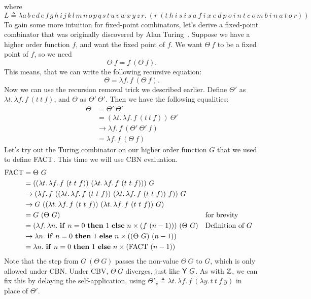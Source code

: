 where
\[
  L\triangleq\lambda a\,b\,c\,d\,e\,f\,g\,h\,i\,j\,k\,l\,m\,n\,o\,p\,q\,s\,t\,u\,v\,w\,x\,y\,z\,r.\
  (r\ (t\ h\ i\ s\ i\ s\ a\ f\ i\ x\ e\ d\ p\ o\ i\ n\ t\ c\ o\ m\ b\ i\ n\ a\ t\ o\ r))
\]
To gain some more intuition for fixed-point combinators, let's derive a fixed-point combinator that
was originally discovered by Alan Turing~\cite{turing}. Suppose we have a higher order function $f$,
and want the fixed point of $f$. We want $\Theta\ f$ to be a fixed point of $f$, so we need
\[
  \Theta\ f=f\ (\Theta\ f).
\]
This means, that we can write the following recursive equation:
\[
  \Theta=\lambda f.\,f\ (\Theta\ f).
\]
Now we can use the recursion removal trick we described earlier. Define $\Theta'$ as
$\lambda t.\,\lambda f.\,f\ (t\ t\ f)$, and $\Theta$ as $\Theta'\ \Theta'$. Then we have the
following equalities:
\begin{align*}
  \Theta&=\Theta'\ \Theta'\\
  &=(\lambda t.\,\lambda f.\,f\ (t\ t\ f))\ \Theta'\\
  &\to\lambda f.\,f\ (\Theta'\ \Theta'\ f)\\
  &=\lambda f.\,f\ (\Theta\ f)
\end{align*}
Let's try out the Turing combinator on our higher order function $G$ that we used to define
$\mathrm{FACT}$. This time we will use CBN evaluation.
\begin{align*}
  \FACT&=\Theta\ G\\
  &=((\lambda t.\,\lambda f.\,f\ (t\ t\ f))\ (\lambda t.\,\lambda f.\,f\ (t\ t\ f)))\ G\\
  &\to(\lambda f.\,f\ ((\lambda t.\,\lambda f.\,f\ (t\ t\ f))\ (\lambda t.\,\lambda f.\,f\ (t\ t\ f))\ f))\ G\\
  &\to G\ ((\lambda t.\,\lambda f.\,f\ (t\ t\ f))\ (\lambda t.\,\lambda f.\,f\ (t\ t\ f))\ G)\\
  &=G\ (\Theta\ G) && \text{for brevity}\\
  &=(\lambda f.\,\lambda n.\ \ite{n=0}{1}{n\times(f\ (n-1))})\ (\Theta\ G) && \text{Definition of } G\\
  &\to\lambda n.\ \ite{n=0}{1}{n\times((\Theta\ G)\ (n-1))}\\
  &=\lambda n.\ \ite{n=0}{1}{n\times(\FACT\ (n-1))}
\end{align*}
Note that the step from $G\ (\Theta\ G)$ passes the non-value $\Theta\ G$ to $G$, which is only
allowed under CBN. Under CBV, $\Theta\ G$ diverges, just like $\mathsf{Y}\ G$. As with $\mathbb{Z}$, we can fix this
by delaying the self-application, using $\Theta'_v\triangleq\lambda t.\,\lambda f.\,f\ (\lambda y.\,t\ t\ f\ y)$
in place of $\Theta'$.
% 
